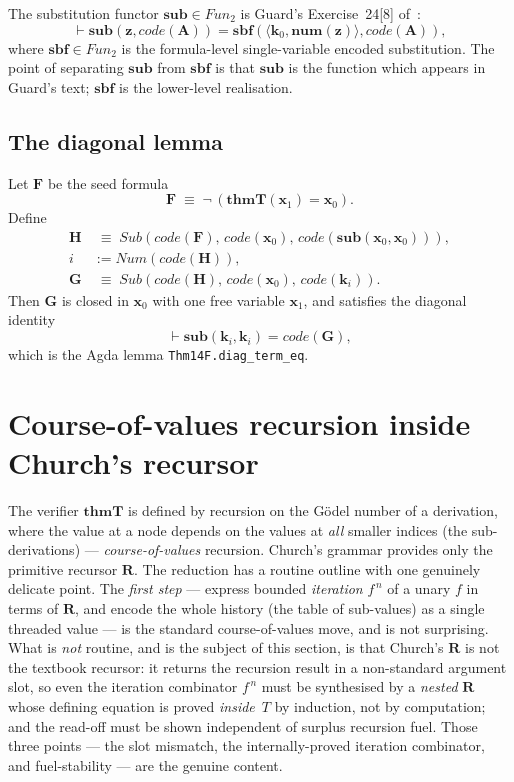 \documentclass[11pt]{article}
\theoremstyle{plain}
\theoremstyle{definition}
\theoremstyle{remark}
\newcommand{\code}[1]{\mathit{code}(#1)}
\newcommand{\sub}{\mathbf{sub}}
\newcommand{\sbf}{\mathbf{sbf}}
\newcommand{\thmT}{\mathbf{thmT}}
\newcommand{\num}{\mathbf{num}}
\newcommand{\seq}[1]{\langle #1 \rangle}
\newcommand{\Fun}{\mathit{Fun}}
\newcommand{\Sub}{\mathit{Sub}}
\newcommand{\Num}{\mathit{Num}}
\begin{document}
The substitution functor $\sub \in \Fun_2$ is Guard's Exercise~24[8]
of~\cite{Guard1963}:
\[
\vdash \sub(\mathbf{z}, \code{\mathbf{A}}) = \sbf(\seq{\mathbf{k}_0, \num(\mathbf{z})}, \code{\mathbf{A}}),
\]
where $\sbf \in \Fun_2$ is the formula-level single-variable encoded
substitution.  The point of separating $\sub$ from $\sbf$ is that
$\sub$ is the function which appears in Guard's text; $\sbf$ is the
lower-level realisation.

\subsection{The diagonal lemma}

Let $\mathbf{F}$ be the seed formula
\[
\mathbf{F} \;\equiv\; \neg\,(\thmT(\mathbf{x}_1) = \mathbf{x}_0).
\]
Define
\begin{align*}
\mathbf{H} &\;\equiv\; \Sub(\code{\mathbf{F}},\, \code{\mathbf{x}_0},\, \code{\sub(\mathbf{x}_0, \mathbf{x}_0)}), \\
i &:= \Num(\code{\mathbf{H}}), \\
\mathbf{G} &\;\equiv\; \Sub(\code{\mathbf{H}},\, \code{\mathbf{x}_0},\, \code{\mathbf{k}_i}).
\end{align*}
Then $\mathbf{G}$ is closed in $\mathbf{x}_0$ with one free variable
$\mathbf{x}_1$, and satisfies the diagonal identity
\[
\vdash \sub(\mathbf{k}_i, \mathbf{k}_i) = \code{\mathbf{G}},
\]
which is the Agda lemma \texttt{Thm14F.diag\_term\_eq}.

\section{Course-of-values recursion inside Church's recursor}
\label{sec:cov}

The verifier $\thmT$ is defined by recursion on the G\"odel number of a
derivation, where the value at a node depends on the values at
\emph{all} smaller indices (the sub-derivations) --- \emph{course-of-values}
recursion.  Church's grammar provides only the primitive recursor
$\mathbf{R}$.  The reduction has a routine outline with one genuinely
delicate point.  The \emph{first step} --- express bounded \emph{iteration}
$f^{\,n}$ of a unary $f$ in terms of $\mathbf{R}$, and encode the whole
history (the table of sub-values) as a single threaded value --- is the
standard course-of-values move, and is not surprising.  What is \emph{not}
routine, and is the subject of this section, is that Church's $\mathbf{R}$
is not the textbook recursor: it returns the recursion result in a
non-standard argument slot, so even the iteration combinator $f^{\,n}$ must
be synthesised by a \emph{nested} $\mathbf{R}$ whose defining equation is
proved \emph{inside}~$T$ by induction, not by computation; and the read-off
must be shown independent of surplus recursion fuel.  Those three points
--- the slot mismatch, the internally-proved iteration combinator, and
fuel-stability --- are the genuine content.
\end{document}
